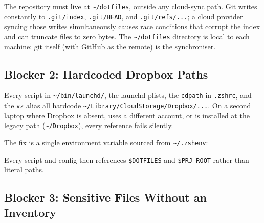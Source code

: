 \documentclass[
  11pt,
  letterpaper,
  DIV=11,
  numbers=noendperiod]{scrartcl}
\newenvironment{Shaded}{\begin{snugshade}}{\end{snugshade}}
\newcommand{\BuiltInTok}[1]{\textcolor[rgb]{0.00,0.23,0.31}{#1}}
\newcommand{\CommentTok}[1]{\textcolor[rgb]{0.37,0.37,0.37}{#1}}
\newcommand{\DataTypeTok}[1]{\textcolor[rgb]{0.68,0.00,0.00}{#1}}
\newcommand{\KeywordTok}[1]{\textcolor[rgb]{0.00,0.23,0.31}{\textbf{#1}}}
\newcommand{\NormalTok}[1]{\textcolor[rgb]{0.00,0.23,0.31}{#1}}
\newcommand{\OperatorTok}[1]{\textcolor[rgb]{0.37,0.37,0.37}{#1}}
\newcommand{\OtherTok}[1]{\textcolor[rgb]{0.00,0.23,0.31}{#1}}
\newcommand{\StringTok}[1]{\textcolor[rgb]{0.13,0.47,0.30}{#1}}
\newcommand{\VariableTok}[1]{\textcolor[rgb]{0.07,0.07,0.07}{#1}}
\begin{document}
The repository must live at \texttt{\textasciitilde{}/dotfiles}, outside
any cloud-sync path. Git writes constantly to \texttt{.git/index},
\texttt{.git/HEAD}, and \texttt{.git/refs/...}; a cloud provider syncing
those writes simultaneously causes race conditions that corrupt the
index and can truncate files to zero bytes. The
\texttt{\textasciitilde{}/dotfiles} directory is local to each machine;
git itself (with GitHub as the remote) is the synchroniser.

\subsection{Blocker 2: Hardcoded Dropbox
Paths}\label{blocker-2-hardcoded-dropbox-paths}

Every script in \texttt{\textasciitilde{}/bin/launchd/}, the launchd
plists, the \texttt{cdpath} in \texttt{.zshrc}, and the \texttt{vz}
alias all hardcode
\texttt{\textasciitilde{}/Library/CloudStorage/Dropbox/...}. On a second
laptop where Dropbox is absent, uses a different account, or is
installed at the legacy path (\texttt{\textasciitilde{}/Dropbox}), every
reference fails silently.

The fix is a single environment variable sourced from
\texttt{\textasciitilde{}/.zshenv}:

\begin{Shaded}
\end{Shaded}

Every script and config then references \texttt{\$DOTFILES} and
\texttt{\$PRJ\_ROOT} rather than literal paths.

\subsection{Blocker 3: Sensitive Files Without an
Inventory}\label{blocker-3-sensitive-files-without-an-inventory}
\end{document}
